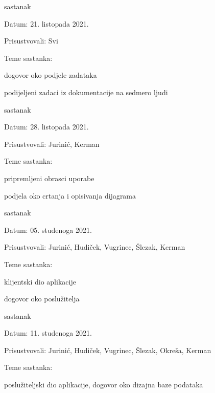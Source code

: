 \begin{packed_enum}
			\item  sastanak
			\item[] \begin{packed_item}
				\item Datum: 21. listopada 2021.
				\item Prisustvovali: Svi
				\item Teme sastanka:
				\begin{packed_item}
					\item  dogovor oko podjele zadataka
					\item  podijeljeni zadaci iz dokumentacije na sedmero ljudi
				\end{packed_item}
			\end{packed_item}
			\item  sastanak
			\item[] \begin{packed_item}
				\item Datum: 28. listopada 2021.
				\item Prisustvovali: Jurinić, Kerman
				\item Teme sastanka:
				\begin{packed_item}
					\item  pripremljeni obrasci uporabe
					\item  podjela oko crtanja i opisivanja dijagrama
				\end{packed_item}
			\end{packed_item}
			\item  sastanak
			\item[] \begin{packed_item}
				\item Datum: 05. studenoga 2021.
				\item Prisustvovali: Jurinić, Hudiček, Vugrinec, Šlezak, Kerman
				\item Teme sastanka:
				\begin{packed_item}
					\item  klijentski dio aplikacije
					\item  dogovor oko poslužitelja
				\end{packed_item}
			\end{packed_item}
\eject
			\item  sastanak
			\item[] \begin{packed_item}
				\item Datum: 11. studenoga 2021.
				\item Prisustvovali: Jurinić, Hudiček, Vugrinec, Šlezak, Okreša, Kerman
				\item Teme sastanka:
				\begin{packed_item}
					\item  poslužiteljski dio aplikacije, dogovor oko dizajna baze podataka
				\end{packed_item}
			\end{packed_item}
			

\end{packed_enum}
